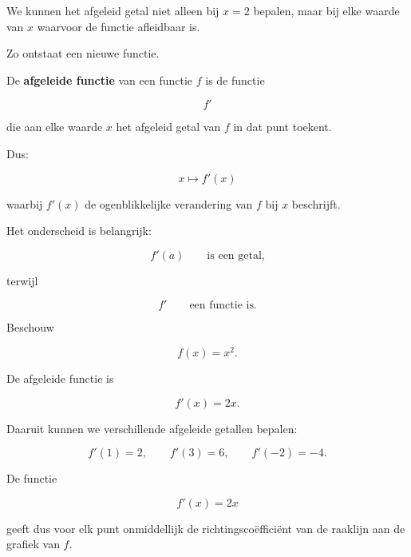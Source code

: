 \documentclass{ximera}
\begin{document}

We kunnen het afgeleid getal niet alleen bij $x=2$ bepalen,
maar bij elke waarde van $x$ waarvoor de functie afleidbaar is.

Zo ontstaat een nieuwe functie.

\begin{definitie}

De \textbf{afgeleide functie} van een functie $f$ is de functie

\[
f'
\]

die aan elke waarde $x$ het afgeleid getal van $f$ in dat punt
toekent.

Dus:

\[
\boxed{
x\longmapsto f'(x)
}
\]

waarbij $f'(x)$ de ogenblikkelijke verandering van $f$
bij $x$ beschrijft.

\end{definitie}


Het onderscheid is belangrijk:

\[
\boxed{f'(a)}
\qquad\text{is een getal,}
\]

terwijl

\[
\boxed{f'}
\qquad\text{een functie is.}
\]


\begin{voorbeeld}

Beschouw

\[
f(x)=x^2.
\]

De afgeleide functie is

\[
f'(x)=2x.
\]

Daaruit kunnen we verschillende afgeleide getallen bepalen:

\[
f'(1)=2,
\qquad
f'(3)=6,
\qquad
f'(-2)=-4.
\]

De functie

\[
f'(x)=2x
\]

geeft dus voor elk punt onmiddellijk de richtingscoëfficiënt
van de raaklijn aan de grafiek van $f$.

\end{voorbeeld}
\end{document}
